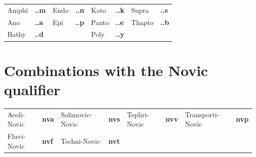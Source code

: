 \documentclass[
  letterpaper,
  DIV=11,
  numbers=noendperiod]{scrreprt}
\begin{document}
\begin{longtable}[]{@{}
  >{\raggedright\arraybackslash}p{}
  >{\raggedright\arraybackslash}p{}
  >{\raggedright\arraybackslash}p{}
  >{\raggedright\arraybackslash}p{}
  >{\raggedright\arraybackslash}p{}
  >{\raggedright\arraybackslash}p{}
  >{\raggedright\arraybackslash}p{}
  >{\raggedright\arraybackslash}p{}@{}}
\toprule()
\endhead
Amphi & \textbf{..m} & Endo & \textbf{..n} & Kato & \textbf{..k} & Supra
& \textbf{..s} \\
Ano & \textbf{..a} & Epi & \textbf{..p} & Panto & \textbf{..e} & Thapto
& \textbf{..b} \\
Bathy & \textbf{..d} & & & Poly & \textbf{..y} & & \\
\bottomrule()
\end{longtable}

\hypertarget{combinations-with-the-novic-qualifier}{%
\section{Combinations with the Novic
qualifier}\label{combinations-with-the-novic-qualifier}}

\begin{longtable}[]{@{}
  >{\raggedright\arraybackslash}p{}
  >{\raggedright\arraybackslash}p{}
  >{\raggedright\arraybackslash}p{}
  >{\raggedright\arraybackslash}p{}
  >{\raggedright\arraybackslash}p{}
  >{\raggedright\arraybackslash}p{}
  >{\raggedright\arraybackslash}p{}
  >{\raggedright\arraybackslash}p{}@{}}
\toprule()
\endhead
Aeoli-Novic & \textbf{nva} & Solimovic-Novic & \textbf{nvs} &
Tephri-Novic & \textbf{nvv} & Transporti-Novic & \textbf{nvp} \\
Fluvi-Novic & \textbf{nvf} & Techni-Novic & \textbf{nvt} & & & & \\
\bottomrule()
\end{longtable}
\end{document}
